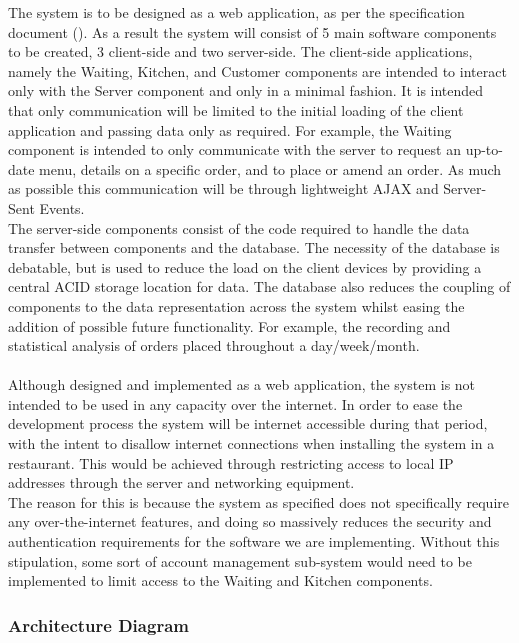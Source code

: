 \documentclass[11pt, a4paper]{report}
\begin{document}
The system is to be designed as a web application, as per the specification document (\cite{Specification}). As a result the system will consist of 5 main software components to be created, 3 client-side and two server-side. The client-side applications, namely the Waiting, Kitchen, and Customer components are intended to interact only with the Server component and only in a minimal fashion.  It is intended that only communication will be limited to the initial loading of the client application and passing data only as required. For example, the Waiting component is intended to only communicate with the server to request an up-to-date menu, details on a specific order, and to place or amend an order. As much as possible this communication will be through lightweight AJAX and Server-Sent Events.\\
The server-side components consist of the code required to handle the data transfer between components and the database. The necessity of the database is debatable, but is used to reduce the load on the client devices by providing a central ACID storage location for data. The database also reduces the coupling of components to the data representation across the system whilst easing the addition of possible future functionality. For example, the recording and statistical analysis of orders placed throughout a day/week/month.\\
\\
Although designed and implemented as a web application, the system is not intended to be used in any capacity over the internet. In order to ease the development process the system will be internet accessible during that period, with the intent to disallow internet connections when installing the system in a restaurant. This would be achieved through restricting access to local IP addresses through the server and networking equipment.\\
The reason for this is because the system as specified does not specifically require any over-the-internet features, and doing so massively reduces the security and authentication requirements for the software we are implementing. Without this stipulation, some sort of account management sub-system would need to be implemented to limit access to the Waiting and Kitchen components.


\subsubsection{Architecture Diagram}
\end{document}
